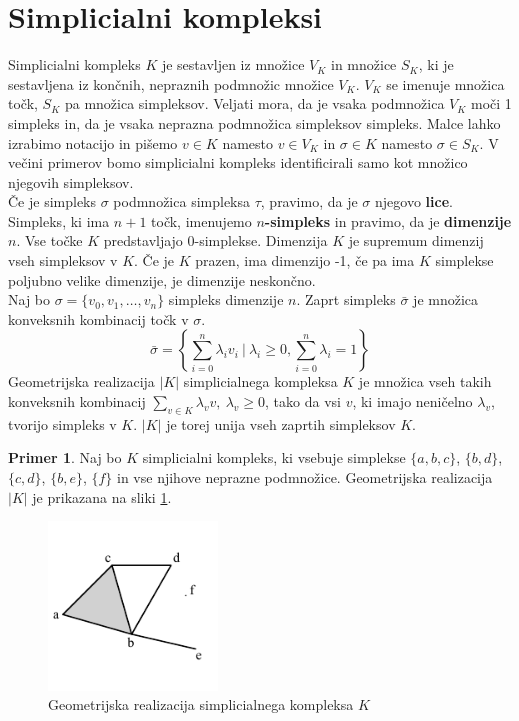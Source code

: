 \documentclass[a4paper, 12pt]{book}
\theoremstyle{definition}
\newtheorem{example}{Primer}[section]
\begin{document}
\section{Simplicialni kompleksi}
Simplicialni kompleks $K$ je sestavljen iz množice $V_K$ in množice $S_K$, ki je
sestavljena iz končnih, nepraznih podmnožic množice $V_K$.
$V_K$ se imenuje množica točk, $S_K$ pa množica simpleksov. Veljati mora, da
je vsaka podmnožica $V_K$ moči 1 simpleks in, da je vsaka neprazna podmnožica
simpleksov simpleks. Malce lahko izrabimo notacijo in pišemo $v \in K$ namesto
$v \in V_K$ in $\sigma \in K$ namesto $\sigma \in S_K$. V večini primerov bomo
simplicialni kompleks identificirali samo kot množico njegovih simpleksov.\\
Če je simpleks $\sigma$ podmnožica simpleksa $\tau$, pravimo, da je $\sigma$ njegovo \textbf{lice}.
Simpleks, ki ima $n+1$ točk, imenujemo \textbf{$n$-simpleks} in pravimo, da je \textbf{dimenzije} $n$.
Vse točke $K$ predstavljajo 0-simplekse. Dimenzija $K$ je supremum dimenzij
vseh simpleksov v $K$. Če je $K$ prazen, ima dimenzijo -1, če pa ima $K$ simplekse
poljubno velike dimenzije, je dimenzije neskončno.\\
Naj bo $\sigma = \{v_0,v_1,\dots,v_n\}$ simpleks dimenzije $n$. Zaprt simpleks
$\bar{\sigma}$ je množica konveksnih kombinacij točk v $\sigma$.
\[
  \bar{\sigma} = \left\{\sum_{i=0}^n \lambda_i v_i\ |\ \lambda_i \geq 0, \sum_{i=0}^n \lambda_i = 1\right\}
\]
Geometrijska realizacija $|K|$ simplicialnega kompleksa $K$ je množica 
vseh takih konveksnih kombinacij $\sum_{v\in K} \lambda_v v,\ \lambda_v \geq 0$, tako da vsi $v$, ki imajo
neničelno $\lambda_v$, tvorijo simpleks v $K$. $|K|$ je torej unija vseh zaprtih
simpleksov $K$.
\begin{example}
  Naj bo $K$ simplicialni kompleks, ki vsebuje simplekse
  $\{a,b,c\}$, $\{b,d\}$, $\{c,d\}$, $\{b,e\}$, $\{f\}$ in vse njihove neprazne
  podmnožice.
  Geometrijska realizacija $|K|$ je prikazana na sliki \ref{sx}.
  \begin{figure}[h]
      \begin{center}
      \includegraphics[width=0.4\textwidth]{simplicialni-kompleks.pdf}
      \end{center}
      \caption{Geometrijska realizacija simplicialnega kompleksa $K$}
      \label{sx}
  \end{figure}
\end{example}
\end{document}
